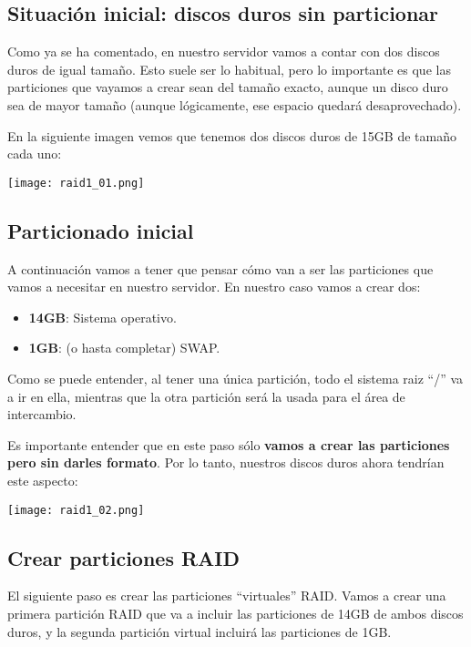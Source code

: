 \subsection{Situación inicial: discos duros sin particionar}
Como ya se ha comentado, en nuestro servidor vamos a contar con dos discos duros de igual tamaño. Esto suele ser lo habitual, pero lo importante es que las particiones que vayamos a crear sean del tamaño exacto, aunque un disco duro sea de mayor tamaño (aunque lógicamente, ese espacio quedará desaprovechado).

En la siguiente imagen vemos que tenemos dos discos duros de 15GB de tamaño cada uno:

\begin{center}
    \texttt{[image: raid1\_01.png]}
\end{center}


\subsection{Particionado inicial}
A continuación vamos a tener que pensar cómo van a ser las particiones que vamos a necesitar en nuestro servidor. En nuestro caso vamos a crear dos:
\begin{itemize}
    \item  \textbf{14GB}: Sistema operativo.
    \item  \textbf{1GB}: (o hasta completar) SWAP.
\end{itemize}

Como se puede entender, al tener una única partición, todo el sistema raiz “/” va a ir en ella, mientras que la otra partición será la usada para el área de intercambio.

Es importante entender que en este paso sólo \textbf{vamos a crear las particiones pero sin darles formato}. Por lo tanto, nuestros discos duros ahora tendrían este aspecto:

\begin{center}
    \texttt{[image: raid1\_02.png]}
\end{center}



\subsection{Crear particiones RAID}
El siguiente paso es crear las particiones “virtuales” RAID. Vamos a crear una primera partición RAID que va a incluir las particiones de 14GB de ambos discos duros, y la segunda partición virtual incluirá las particiones de 1GB.

